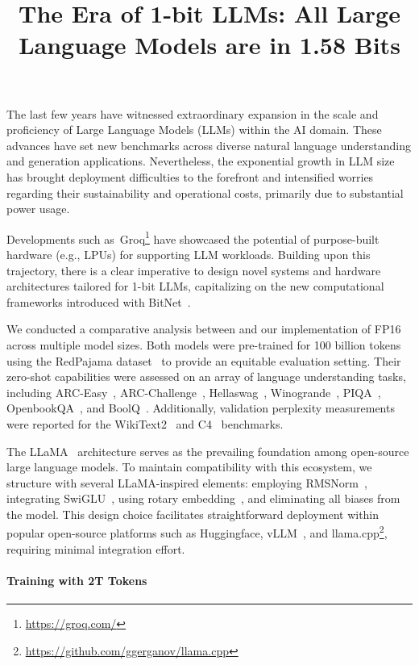 \title{The Era of 1-bit LLMs: All Large Language Models are in 1.58 Bits}
The last few years have witnessed extraordinary expansion in the scale and proficiency of Large Language Models (LLMs) within the AI domain. These advances have set new benchmarks across diverse natural language understanding and generation applications. Nevertheless, the exponential growth in LLM size has brought deployment difficulties to the forefront and intensified worries regarding their sustainability and operational costs, primarily due to substantial power usage.

Developments such as~Groq\footnote{\url{https://groq.com/}} have showcased the potential of purpose-built hardware (e.g., LPUs) for supporting LLM workloads. Building upon this trajectory, there is a clear imperative to design novel systems and hardware architectures tailored for 1-bit LLMs, capitalizing on the new computational frameworks introduced with BitNet~\cite{bitnet}.

We conducted a comparative analysis between  and our implementation of FP16  across multiple model sizes. Both models were pre-trained for 100 billion tokens using the RedPajama dataset~\cite{redpajama} to provide an equitable evaluation setting. Their zero-shot capabilities were assessed on an array of language understanding tasks, including ARC-Easy~\cite{arc}, ARC-Challenge~\cite{arc}, Hellaswag~\cite{hellaswag}, Winogrande~\cite{winoGrande}, PIQA~\cite{piqa}, OpenbookQA~\cite{openbookqa}, and BoolQ~\cite{boolq}. Additionally, validation perplexity measurements were reported for the WikiText2~\cite{wikitext2} and C4~\cite{c4} benchmarks.

The LLaMA~\cite{llama, llama2} architecture serves as the prevailing foundation among open-source large language models. To maintain compatibility with this ecosystem, we structure  with several LLaMA-inspired elements: employing RMSNorm~\cite{rmsnorm}, integrating SwiGLU~\cite{swiglu}, using rotary embedding~\cite{rope}, and eliminating all biases from the model. This design choice facilitates straightforward deployment within popular open-source platforms such as Huggingface, vLLM~\cite{vllm}, and llama.cpp\footnote{\url{https://github.com/ggerganov/llama.cpp}}, requiring minimal integration effort.

\paragraph{Training with 2T Tokens}

